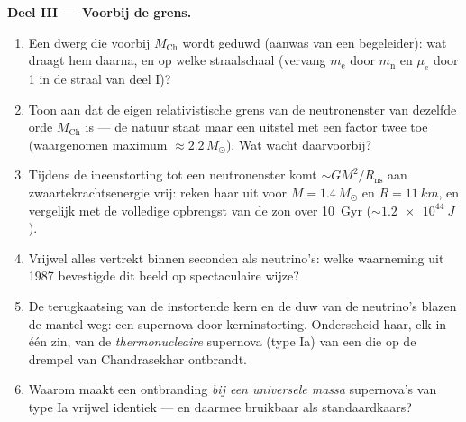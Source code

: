 \begin{problem}
\medskip\noindent\textbf{Deel III --- Voorbij de grens.}
\begin{enumerate}[resume]
  \item Een dwerg die voorbij $M_{\text{Ch}}$ wordt geduwd (aanwas van een
        begeleider): wat draagt hem daarna, en op welke straalschaal
        (vervang $m_{\text{e}}$ door $m_{\text{n}}$ en $\mu_e$ door 1 in de
        straal van deel I)?
  \item Toon aan dat de eigen relativistische grens van de neutronenster
        van dezelfde orde $M_{\text{Ch}}$ is --- de natuur staat maar een
        uitstel met een factor twee toe (waargenomen maximum $\approx
        2.2\,M_\odot$). Wat wacht daarvoorbij?
  \item Tijdens de ineenstorting tot een neutronenster komt
        $\sim GM^2/R_{
        \text{ns}}$ aan zwaartekrachtsenergie vrij: reken
        haar uit voor $M = 1.4\,M_\odot$ en $R = \qty{11}{km}$, en
        vergelijk met de volledige opbrengst van de zon over
        \qty{10}{Gyr} ($\sim\qty{1.2e44}{J}$).
  \item Vrijwel alles vertrekt binnen seconden als neutrino's: welke
        waarneming uit 1987 bevestigde dit beeld op spectaculaire wijze?
  \item De terugkaatsing van de instortende kern en de duw van de
        neutrino's blazen de mantel weg: een supernova door
        kerninstorting. Onderscheid haar, elk in één zin, van de
        \emph{thermonucleaire} supernova (type Ia) van een  die
        op de drempel van Chandrasekhar ontbrandt.
  \item Waarom maakt een ontbranding \emph{bij een universele massa}
        supernova's van type Ia vrijwel identiek --- en daarmee bruikbaar
        als standaardkaars?
\end{enumerate}


\end{problem}
